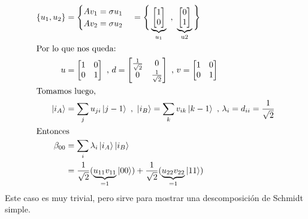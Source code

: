 \documentclass[a4paper]{article}
\begin{document}
\begin{enumerate}[label=(\alph*)]
\begin{align*}
             \{u_1, u_2 \} &= \begin{cases} Av_1 = \sigma u_1 \\ Av_2 = \sigma u_2 \end{cases} = \Bigg\{ \underbrace{\begin{bmatrix} 1 \\ 0 \end{bmatrix}}_{u_1} \text{ , } \underbrace{\begin{bmatrix} 0 \\ 1 \end{bmatrix}}_{\text{u2}}\Bigg\} \\
            \intertext{Por lo que nos queda: }
             u &=
            \begin{bmatrix}
                1 & 0 \\
                0 & 1 \\
            \end{bmatrix}
            \text{      ,       }
            d = 
            \begin{bmatrix}
                \frac{1}{\sqrt{2}} & 0 \\
                0 & \frac{1}{\sqrt{2}} \\
            \end{bmatrix}
            \text{      ,       }
            v = 
            \begin{bmatrix}
                1 & 0 \\
                0 & 1 \\
            \end{bmatrix}\\
            \intertext{Tomamos luego,}
            \ket{i_A} &= \sum_{j} u_{ji} \ket{j-1} \text{ , } \ket{i_B} = \sum_{k} v_{ik} \ket{k-1}\text{ , } \lambda_i = d_{ii} = \frac{1}{\sqrt{2}}\\
            \intertext{Entonces}
            \beta_{00} &= \sum_{i} \lambda_i \ket{i_A}\ket{i_B}\\
                       &= \frac{1}{\sqrt{2}}(\underbrace{u_{11} v_{11}}_{=1} \ket{00}) + \frac{1}{\sqrt{2}}(\underbrace{u_{22} v_{22}}_{=1} \ket{11})
    \end{align*}
    Este caso es muy trivial, pero sirve para mostrar una descomposición de Schmidt simple.\\
    

\end{enumerate}
\end{document}
